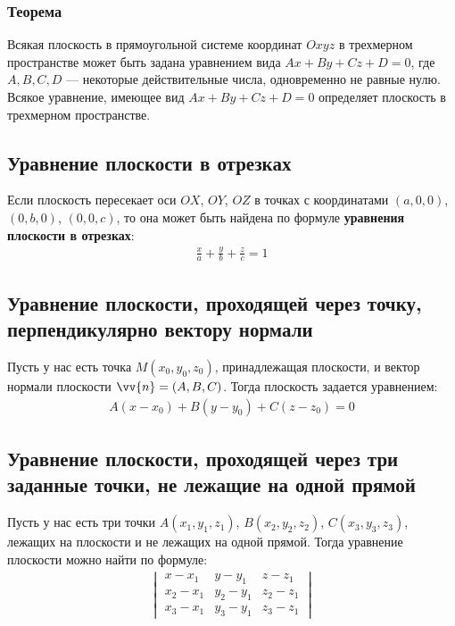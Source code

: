 \documentclass[a4paper,12pt]{extbook}
\theoremstyle{numbered}
\theoremstyle{named}
\theoremstyle{named}
\theoremstyle{named}
\begin{document}
\subsubsection*{Теорема}
Всякая плоскость в прямоугольной системе координат \(Oxyz\) в трехмерном пространстве может быть задана уравнением вида \(Ax + By + Cz + D = 0\), где \(A, B, C, D\) — некоторые действительные числа, одновременно не равные нулю. Всякое уравнение, имеющее вид \(Ax + By + Cz + D = 0\) определяет плоскость в трехмерном пространстве.


\subsection*{Уравнение плоскости в отрезках}
Если плоскость пересекает оси \(OX\), \(OY\), \(OZ\) в точках с координатами \((a, 0, 0)\), \((0, b, 0)\), \((0, 0, c)\), то она может быть найдена по формуле \textbf{уравнения плоскости в отрезках}:
\begin{gather*}
    \frac{x}{a} + \frac{y}{b} + \frac{z}{c} = 1
\end{gather*}


\subsection*{Уравнение плоскости, проходящей через точку, перпендикулярно вектору нормали}
Пусть у нас есть точка \(M(x_0, y_0, z_0)\), принадлежащая плоскости, и вектор нормали плоскости \(\vv{n} = (A, B, C)\). Тогда плоскость задается уравнением:
\begin{gather*}
    A(x - x_0) + B(y - y_0) + C(z - z_0) = 0
\end{gather*}


\subsection*{Уравнение плоскости, проходящей через три заданные точки, не лежащие на одной прямой}
Пусть у нас есть три точки \(A(x_1, y_1, z_1)\), \(B(x_2, y_2, z_2)\), \(C(x_3, y_3, z_3)\), лежащих на плоскости и не лежащих на одной прямой. Тогда уравнение плоскости можно найти по формуле:
\begin{gather*}
    \begin{vmatrix}
        x - x_1   & y - y_1   & z - z_1   \\
        x_2 - x_1 & y_2 - y_1 & z_2 - z_1 \\
        x_3 - x_1 & y_3 - y_1 & z_3 - z_1
    \end{vmatrix}
\end{gather*}
\end{document}
